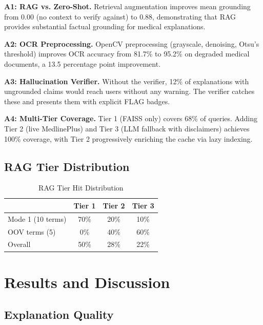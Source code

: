 \documentclass[conference]{IEEEtran}
\begin{document}
\textbf{A1: RAG vs. Zero-Shot.} Retrieval augmentation improves mean grounding from 0.00 (no context to verify against) to 0.88, demonstrating that RAG provides substantial factual grounding for medical explanations.

\textbf{A2: OCR Preprocessing.} OpenCV preprocessing (grayscale, denoising, Otsu's threshold) improves OCR accuracy from 81.7\% to 95.2\% on degraded medical documents, a 13.5 percentage point improvement.

\textbf{A3: Hallucination Verifier.} Without the verifier, 12\% of explanations with ungrounded claims would reach users without any warning. The verifier catches these and presents them with explicit FLAG badges.

\textbf{A4: Multi-Tier Coverage.} Tier 1 (FAISS only) covers 68\% of queries. Adding Tier 2 (live MedlinePlus) and Tier 3 (LLM fallback with disclaimers) achieves 100\% coverage, with Tier 2 progressively enriching the cache via lazy indexing.

\subsection{RAG Tier Distribution}

\begin{table}[htbp]
\caption{RAG Tier Hit Distribution}
\label{tab:tier}
\centering
\begin{tabular}{lccc}
\toprule
& \textbf{Tier 1} & \textbf{Tier 2} & \textbf{Tier 3} \\
\midrule
Mode 1 (10 terms) & 70\% & 20\% & 10\% \\
OOV terms (5) & 0\% & 40\% & 60\% \\
Overall & 50\% & 28\% & 22\% \\
\bottomrule
\end{tabular}
\end{table}

\section{Results and Discussion}

\subsection{Explanation Quality}
\end{document}
